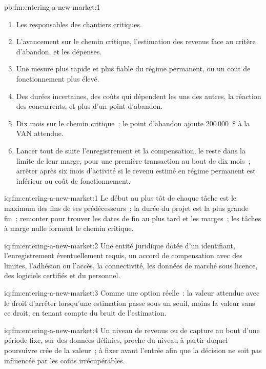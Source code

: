 \begin{solution}{pb:fm:entering-a-new-market:1}
\begin{enumerate}
\item Les responsables des chantiers critiques.
\item L'avancement sur le chemin critique, l'estimation des revenus face au critère d'abandon, et les dépenses.
\item Une mesure plus rapide et plus fiable du régime permanent, ou un coût de fonctionnement plus élevé.
\item Des durées incertaines, des coûts qui dépendent les uns des autres, la réaction des concurrents, et plus d'un point d'abandon.
\item Dix mois sur le chemin critique~; le point d'abandon ajoute 200\,000~\$ à la VAN attendue.
\item Lancer tout de suite l'enregistrement et la compensation, le reste dans la limite de leur marge, pour une première transaction au bout de dix mois~; arrêter après six mois d'activité si
le revenu estimé en régime permanent est inférieur au coût de fonctionnement.
\end{enumerate}
\end{solution}

\begin{solution}{iq:fm:entering-a-new-market:1}
Le début au plus tôt de chaque tâche est le maximum des fins de ses prédécesseurs~; la durée du projet est la plus grande fin~; remonter pour trouver les
dates de fin au plus tard et les marges~; les tâches à marge nulle forment le chemin critique.
\end{solution}

\begin{solution}{iq:fm:entering-a-new-market:2}
Une entité juridique dotée d'un identifiant, l'enregistrement éventuellement requis, un accord de compensation avec des limites, l'adhésion ou l'accès, la connectivité, les données de marché
sous licence, des logiciels certifiés et du personnel.
\end{solution}

\begin{solution}{iq:fm:entering-a-new-market:3}
Comme une option réelle~: la valeur attendue avec le droit d'arrêter lorsqu'une estimation passe sous un seuil, moins la valeur sans ce droit, en tenant compte du
bruit de l'estimation.
\end{solution}

\begin{solution}{iq:fm:entering-a-new-market:4}
Un niveau de revenus ou de capture au bout d'une période fixe, sur des données définies, proche du niveau à partir duquel poursuivre crée de la valeur~; à fixer avant l'entrée afin que la
décision ne soit pas influencée par les coûts irrécupérables.
\end{solution}

